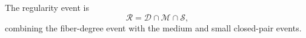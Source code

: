 \begin{definition}
The regularity event is
\[
\mathcal R=\mathcal D\cap\mathcal M\cap\mathcal S,
\]
combining the fiber-degree event with the medium and small closed-pair events.
\end{definition}
